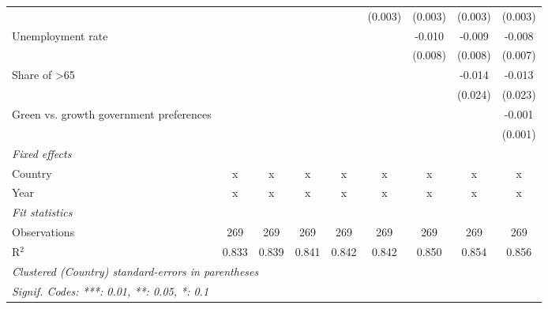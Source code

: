 \begin{table}[htbp]
\begin{tabular}{lcccccccc}
                                                               &         &         &         &         & (0.003)     & (0.003)      & (0.003)        & (0.003)\\   
      Unemployment rate                                        &         &         &         &         &             & -0.010       & -0.009         & -0.008\\   
                                                               &         &         &         &         &             & (0.008)      & (0.008)        & (0.007)\\   
      Share of >65                                             &         &         &         &         &             &              & -0.014         & -0.013\\   
                                                               &         &         &         &         &             &              & (0.024)        & (0.023)\\   
      Green vs. growth government preferences                  &         &         &         &         &             &              &                & -0.001\\   
                                                               &         &         &         &         &             &              &                & (0.001)\\   
      \emph{Fixed effects}\\
      Country                                                  & x       & x       & x       & x       & x           & x            & x              & x\\  
      Year                                                     & x       & x       & x       & x       & x           & x            & x              & x\\  
      \midrule \emph{Fit statistics}\\
      Observations                                             & 269     & 269     & 269     & 269     & 269         & 269          & 269            & 269\\  
      R$^2$                                                    & 0.833   & 0.839   & 0.841   & 0.842   & 0.842       & 0.850        & 0.854          & 0.856\\  
      \midrule
      \multicolumn{9}{l}{\emph{Clustered (Country) standard-errors in parentheses}}\\
      \multicolumn{9}{l}{\emph{Signif. Codes: ***: 0.01, **: 0.05, *: 0.1}}\\
   \end{tabular}
\end{table}


